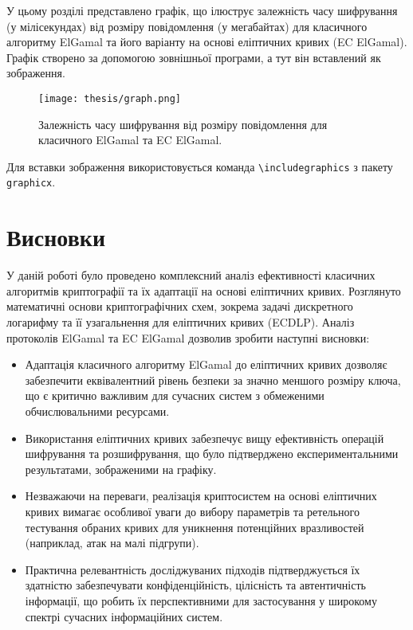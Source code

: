 \documentclass[12pt]{report}
\theoremstyle{definition}
\theoremstyle{plain}
\begin{document}
У цьому розділі представлено графік, що ілюструє залежність часу шифрування (у мілісекундах) від розміру повідомлення (у мегабайтах) для класичного алгоритму ElGamal та його варіанту на основі еліптичних кривих (EC ElGamal). Графік створено за допомогою зовнішньої програми, а тут він вставлений як зображення.

\begin{figure}[htbp]
  \centering
  \texttt{[image: thesis/graph.png]} 
  \caption{Залежність часу шифрування від розміру повідомлення для класичного ElGamal та EC ElGamal.}
  \label{fig:graph_photo_jpg}
\end{figure}

\noindent
Для вставки зображення використовується команда \verb|\includegraphics| з пакету \verb|graphicx|.


\chapter*{Висновки}

У даній роботі було проведено комплексний аналіз ефективності класичних алгоритмів криптографії та їх адаптації на основі еліптичних кривих. Розглянуто математичні основи криптографічних схем, зокрема задачі дискретного логарифму та її узагальнення для еліптичних кривих (ECDLP). Аналіз протоколів ElGamal та EC ElGamal дозволив зробити наступні висновки:

\begin{itemize}
    \item Адаптація класичного алгоритму ElGamal до еліптичних кривих дозволяє забезпечити еквівалентний рівень безпеки за значно меншого розміру ключа, що є критично важливим для сучасних систем з обмеженими обчислювальними ресурсами.
    \item Використання еліптичних кривих забезпечує вищу ефективність операцій шифрування та розшифрування, що було підтверджено експериментальними результатами, зображеними на графіку.
    \item Незважаючи на переваги, реалізація криптосистем на основі еліптичних кривих вимагає особливої уваги до вибору параметрів та ретельного тестування обраних кривих для уникнення потенційних вразливостей (наприклад, атак на малі підгрупи).
    \item Практична релевантність досліджуваних підходів підтверджується їх здатністю забезпечувати конфіденційність, цілісність та автентичність інформації, що робить їх перспективними для застосування у широкому спектрі сучасних інформаційних систем.
\end{itemize}
\end{document}
